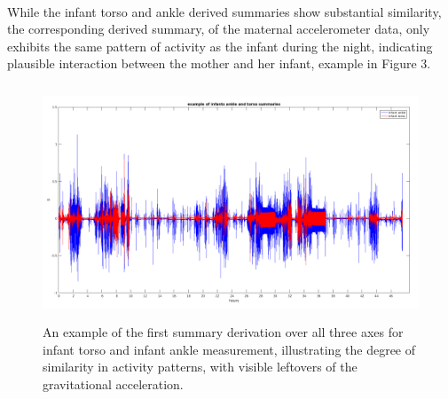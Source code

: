 \documentclass{article}
\begin{document}
{\\
While the infant torso and ankle derived summaries show substantial similarity, the corresponding derived summary, of the maternal accelerometer data, only exhibits the same pattern of activity as the infant during the night, indicating plausible interaction between the mother and her infant, example in Figure 3.
\newpage
\begin{figure}[h!]
\includegraphics[width=15cm, height=7cm]{exampleTorsoAnkle.png}
\caption{An example of the first summary derivation over all three axes for infant torso and infant ankle measurement, illustrating the degree of similarity in activity patterns, with visible leftovers of the gravitational acceleration.}
\end{figure}

}
\end{document}

